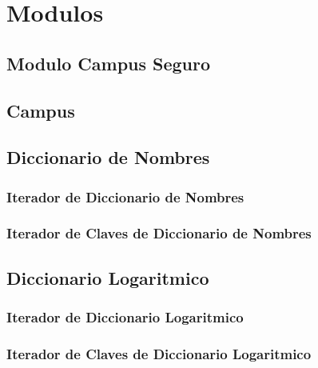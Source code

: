 \documentclass[a4paper,10pt, nofootinbib]{article}
\begin{document}
\thispagestyle{empty}

\maketitle

\tableofcontents
\newpage


\clearpage
\section{Modulos}
\subsection{Modulo Campus Seguro}


\subsection{Campus}


\subsection{Diccionario de Nombres}

\subsubsection{Iterador de Diccionario de Nombres}

\subsubsection{Iterador de Claves de Diccionario de Nombres}



\subsection{Diccionario Logaritmico}

\subsubsection{Iterador de Diccionario Logaritmico}
%
\subsubsection{Iterador de Claves de Diccionario Logaritmico}

\end{document}
